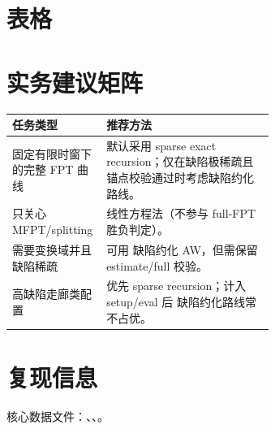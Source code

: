 \documentclass[11pt]{ctexart}
\begin{document}
\section{表格}
\begin{table}[H]
\centering
\small
\caption{按缺陷分箱与时窗分组的运行比摘要。}
\resizebox{\linewidth}{!}{}
\end{table}
\begin{table}[H]
\centering
\small
\caption{锚点配置运行时基线。}
\resizebox{\linewidth}{!}{}
\end{table}
\clearpage
\section{实务建议矩阵}
\begin{table}[H]
\centering
\small
\begin{tabular}{@{}lp{0.64\linewidth}@{}}
\toprule
任务类型 & 推荐方法 \\
\midrule
固定有限时窗下的完整 FPT 曲线 & 默认采用 sparse exact recursion；仅在缺陷极稀疏且锚点校验通过时考虑缺陷约化路线。 \\
只关心 MFPT/splitting & 线性方程法（不参与 full-FPT 胜负判定）。 \\
需要变换域并且缺陷稀疏 & 可用 缺陷约化 AW，但需保留 estimate/full 校验。 \\
高缺陷走廊类配置 & 优先 sparse recursion；计入 setup/eval 后 缺陷约化路线常不占优。 \\
\bottomrule
\end{tabular}
\end{table}
\section{复现信息}
核心数据文件：、、。
\end{document}

